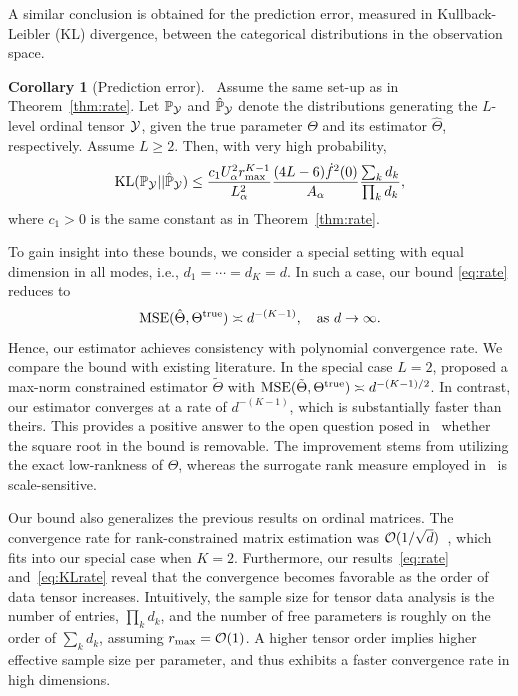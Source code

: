 \documentclass{article}
\theoremstyle{plain}
\theoremstyle{definition}
\newtheorem{cor}{Corollary}
\begin{document}
A similar conclusion is obtained for the prediction error, measured in Kullback-Leibler (KL) divergence, between the categorical distributions in the observation space.
\begin{cor}[Prediction error]~\label{cor:prediction}
Assume the same set-up as in Theorem~\ref{thm:rate}. Let $\mathbb{P}_{\mathcal{Y}}$ and $\hat{\mathbb{P}}_{\mathcal{Y}}$ denote the distributions generating the $L$-level ordinal tensor $\mathcal{Y}$, given the true parameter $\Theta$ and its estimator $\hat \Theta$, respectively. Assume $L\geq 2$. Then, with very high probability,
\begin{equation}\label{eq:KLrate}
\text{KL}(\mathbb{P}_{\mathcal{Y}} || \hat{\mathbb{P}}_{\mathcal{Y}}) \leq  {c_1 U^2_\alpha r_{\max}^{K-1}  \over L^2_\alpha } {(4L-6)\dot{f}^2(0)  \over A_\alpha} {\sum_kd_k\over  \prod_k d_k},
\end{equation}
where $c_1 >0$ is the same constant as in Theorem~\ref{thm:rate}.
\end{cor}
To gain insight into these bounds, we consider a special setting with equal dimension in all modes, i.e., $d_1=\cdots=d_K=d$. In such a case, our bound \eqref{eq:rate} reduces to
\begin{equation}\label{eq:ours}
\text{MSE}(\hat \Theta, \Theta^{\mathrm{true}}) \asymp d^{-(K-1)}, \quad \text{as}\ d\to \infty.
\end{equation}
Hence, our estimator achieves consistency with polynomial convergence rate. We compare the bound with existing literature. In the special case $L=2$, \citet{ghadermarzy2018learning} proposed a max-norm constrained estimator $\tilde{\Theta}$ with $\text{MSE}(\tilde{\Theta}, \Theta^{\mathrm{true}}) \asymp  d^{-(K-1)/2}$. In contrast, our estimator converges at a rate of $d^{-(K-1)}$, which is substantially faster than theirs. This provides a positive answer to the open question posed in~\citet{ghadermarzy2018learning} whether the square root in the bound is removable. The improvement stems from utilizing the exact low-rankness of $\Theta$, whereas the surrogate rank measure employed in~\citet{ghadermarzy2018learning} is scale-sensitive.

Our bound also generalizes the previous results on ordinal matrices. The convergence rate for rank-constrained matrix estimation was $\mathcal{O}(1/\sqrt{d})$~\citep{bhaskar2016probabilistic}, which fits into our special case when $K=2$. Furthermore, our results~\eqref{eq:rate} and~\eqref{eq:KLrate} reveal that the convergence becomes favorable as the order of data tensor increases. Intuitively, the sample size for tensor data analysis is the number of entries, $\prod_k d_k$, and the number of free parameters is roughly on the order of $\sum_{k}d_k$, assuming $r_{\max}=\mathcal{O}(1)$. A higher tensor order implies higher effective sample size per parameter, and thus exhibits a faster convergence rate in high dimensions.
\end{document}
